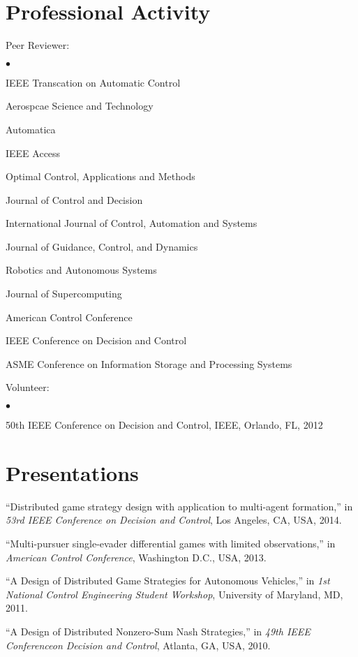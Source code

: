 \documentclass[margin,line]{res}
\newenvironment{list1}{
  \begin{list}{\ding{113}}{%
      \setlength{\itemsep}{0in}
      \setlength{\parsep}{0in} \setlength{\parskip}{0in}
      \setlength{\topsep}{0in} \setlength{\partopsep}{0in} 
      \setlength{\leftmargin}{0.17in}}}{\end{list}}
\newenvironment{list2}{
  \begin{list}{$\bullet$}{%
      \setlength{\itemsep}{0in}
      \setlength{\parsep}{0in} \setlength{\parskip}{0in}
      \setlength{\topsep}{0in} \setlength{\partopsep}{0in} 
      \setlength{\leftmargin}{0.2in}}}{\end{list}}
\begin{document}
\begin{resume}
\section{\sc Professional Activity}
\begin{list1}
\item[] Peer Reviewer:
\vspace*{.05in}
\begin{list2}
\item IEEE Transcation on Automatic Control
\item Aerospcae Science and Technology
\item Automatica
\item IEEE Access
\item Optimal Control, Applications and Methods
\item Journal of Control and Decision
\item International Journal of Control, Automation and Systems 
\item Journal of Guidance, Control, and Dynamics
\item Robotics and Autonomous Systems
\item Journal of Supercomputing
\item American Control Conference
\item IEEE Conference on Decision and Control
\item ASME Conference on Information Storage and Processing Systems
\end{list2}
\vspace*{.1in}
\item[] Volunteer:
\begin{list2}
\item 50th IEEE Conference on Decision and Control, IEEE, Orlando, FL, 2012
\end{list2}
\end{list1}


\section{\sc Presentations} 
\begin{list1}
\item[] ``Distributed game strategy design with application to multi-agent formation,'' in \emph{53rd IEEE Conference on Decision and Control}, Los Angeles, CA, USA, 2014.
\vspace*{0.3cm}
\item[] ``Multi-pursuer single-evader differential games with limited observations,'' in \emph{American Control Conference}, Washington D.C., USA, 2013.
\vspace*{0.3cm}
\item[] ``A Design of Distributed Game Strategies for Autonomous Vehicles,'' in \emph{1st National Control Engineering Student Workshop}, University of Maryland, MD, 2011.
\vspace*{0.3cm}
\item[] ``A Design of Distributed Nonzero-Sum Nash Strategies,'' in \emph{49th IEEE Conferenceon Decision and Control}, Atlanta, GA, USA, 2010. 
\end{list1}



\end{resume}
\end{document}
